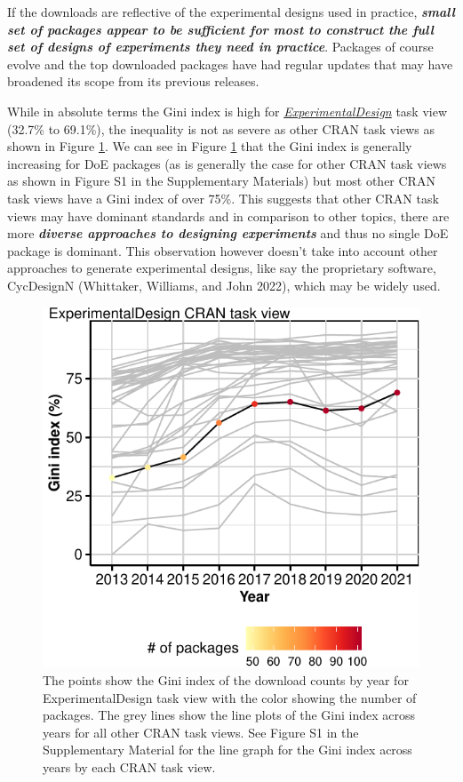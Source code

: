 \documentclass{article}
\begin{document}
If the downloads are reflective of the experimental designs used in
practice, \textbf{\emph{small set of packages appear to be sufficient
for most to construct the full set of designs of experiments they need
in practice}}. Packages of course evolve and the top downloaded packages
have had regular updates that may have broadened its scope from its
previous releases.

While in absolute terms the Gini index is high for
\href{http://CRAN.R-project.org/view=ExperimentalDesign}{\emph{ExperimentalDesign}}
task view (32.7\% to 69.1\%), the inequality is not as severe as other
CRAN task views as shown in Figure \ref{fig:fig-gini-all-ctvs}. We can
see in Figure \ref{fig:fig-gini-all-ctvs} that the Gini index is
generally increasing for DoE packages (as is generally the case for
other CRAN task views as shown in Figure S1 in the Supplementary
Materials) but most other CRAN task views have a Gini index of over
75\%. This suggests that other CRAN task views may have dominant
standards and in comparison to other topics, there are more
\textbf{\emph{diverse approaches to designing experiments}} and thus no
single DoE package is dominant. This observation however doesn't take
into account other approaches to generate experimental designs, like say
the proprietary software, CycDesignN (Whittaker, Williams, and John
2022), which may be widely used.

\begin{figure}[htbp]

{\centering \includegraphics{figures/fig-gini-all-ctvs-1} 

}

\caption{The points show the Gini index of the download counts by year for ExperimentalDesign task view with the color showing the number of packages. The grey lines show the line plots of the Gini index across years for all other CRAN task views. See Figure S1 in the Supplementary Material for the line graph for the Gini index across years by each CRAN task view.}\label{fig:fig-gini-all-ctvs}
\end{figure}
\end{document}
